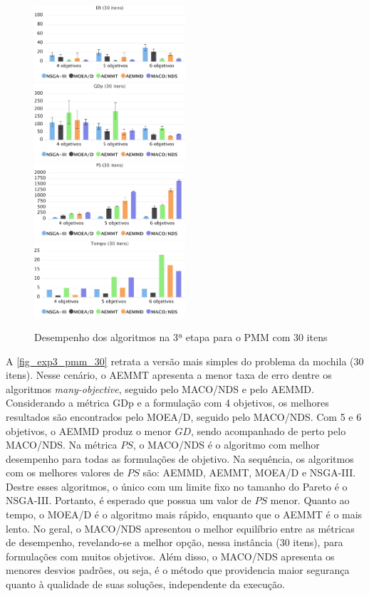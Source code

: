 \begin{figure}[!htbp]	
	\includegraphics[width=0.5\textwidth]{cap_experimentos/figs/etapa3/er-mkp-30}
	\includegraphics[width=0.5\textwidth]{cap_experimentos/figs/etapa3/gd-mkp-30}
	\includegraphics[width=0.5\textwidth]{cap_experimentos/figs/etapa3/ps-mkp-30}
	\includegraphics[width=0.5\textwidth]{cap_experimentos/figs/etapa3/time-mkp-30}
	\caption{\label{fig_exp3_pmm_30}Desempenho dos algoritmos na 3ª etapa para o PMM com 30 itens}
\end{figure}

A \autoref{fig_exp3_pmm_30} retrata a versão mais simples do problema da mochila (30 itens). Nesse cenário, o AEMMT apresenta a menor taxa de erro dentre os algoritmos \textit{many-objective}, seguido pelo MACO/NDS e pelo AEMMD. Considerando a métrica GDp e a formulação com 4 objetivos, os melhores resultados são encontrados pelo MOEA/D, seguido pelo MACO/NDS. Com 5 e 6 objetivos, o AEMMD produz o menor $GD$, sendo acompanhado de perto pelo MACO/NDS. Na métrica $PS$, o MACO/NDS é o algoritmo com melhor desempenho para todas as formulações de objetivo. Na sequência, os algoritmos com os melhores valores de $PS$ são: AEMMD, AEMMT, MOEA/D e NSGA-III. Destre esses algoritmos, o único com um limite fixo no tamanho do Pareto é o NSGA-III. Portanto, é esperado que possua um valor de $PS$ menor. Quanto ao tempo, o MOEA/D é o algoritmo mais rápido, enquanto que o AEMMT é o mais lento. No geral, o MACO/NDS apresentou o melhor equilíbrio entre as métricas de desempenho, revelando-se a melhor opção, nessa instância (30 itens), para formulações com muitos objetivos. Além disso, o MACO/NDS apresenta os menores desvios padrões, ou seja, é o método que providencia maior segurança quanto à qualidade de suas soluções, independente da execução.

